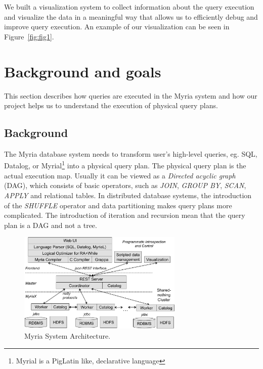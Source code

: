 \documentclass[11pt]{scrartcl}
\begin{document}
We built a visualization system to collect information about the query execution and visualize the data in a meaningful way that allows us to efficiently debug and improve query execution. An example of our visualization can be seen in Figure~\ref{fig:fig1}.

\section{Background and goals}

This section describes how queries are executed in the Myria system and how our project helps us to understand the execution of physical query plans.


\subsection{Background}
\label{sec:background}

The Myria database system needs to transform user's high-level queries, eg. SQL, Datalog, or Myrial\footnote{Myrial is a PigLatin like, declarative language} into a physical query plan. The physical query plan is the actual execution map. Usually it can be viewed as a \emph{Directed acyclic graph} (DAG), which consists of basic operators, such as \emph{JOIN}, \emph{GROUP BY}, \emph{SCAN}, \emph{APPLY} and relational tables. In distributed database systems, the introduction of the \emph{SHUFFLE} operator and data partitioning makes query plans more complicated. The introduction of iteration and recursion mean that the query plan is a DAG and not a tree.

\begin{figure}
 \begin{center}
     \includegraphics[width=0.7\textwidth]{arch}
   \end{center}
  \caption{Myria System Architecture.}
  \label{fig:myria_arc}
\end{figure}
\end{document}
